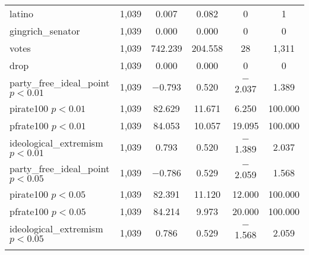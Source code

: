 \documentclass[12pt]{article}
\begin{document}
\begin{table}[!htbp]
\begin{tabular}{@{\extracolsep{5pt}}lccccc}
		latino & 1,039 & 0.007 & 0.082 & 0 & 1 \\ 
		gingrich\_senator & 1,039 & 0.000 & 0.000 & 0 & 0 \\ 
		votes & 1,039 & 742.239 & 204.558 & 28 & 1,311 \\ 
		drop & 1,039 & 0.000 & 0.000 & 0 & 0 \\ 
		\hline
		party\_free\_ideal\_point $ p < 0.01 $ & 1,039 & $-$0.793 & 0.520 & $-$2.037 & 1.389 \\  
		pirate100 $ p < 0.01 $ & 1,039 & 82.629 & 11.671 & 6.250 & 100.000 \\ 
		pfrate100 $ p < 0.01 $ & 1,039 & 84.053 & 10.057 & 19.095 & 100.000 \\ 
		ideological\_extremism $ p < 0.01 $ & 1,039 & 0.793 & 0.520 & $-$1.389 & 2.037 \\ 
		\hline
		party\_free\_ideal\_point $ p < 0.05 $ & 1,039 & $-$0.786 & 0.529 & $-$2.059 & 1.568 \\ 
		pirate100 $ p < 0.05 $ & 1,039 & 82.391 & 11.120 & 12.000 & 100.000 \\  
		pfrate100 $ p < 0.05 $ & 1,039 & 84.214 & 9.973 & 20.000 & 100.000 \\ 
		ideological\_extremism $ p < 0.05 $ & 1,039 & 0.786 & 0.529 & $-$1.568 & 2.059 \\ 
		\hline \\[-1.8ex] 
	\end{tabular} 
\end{table} 
\end{document}
